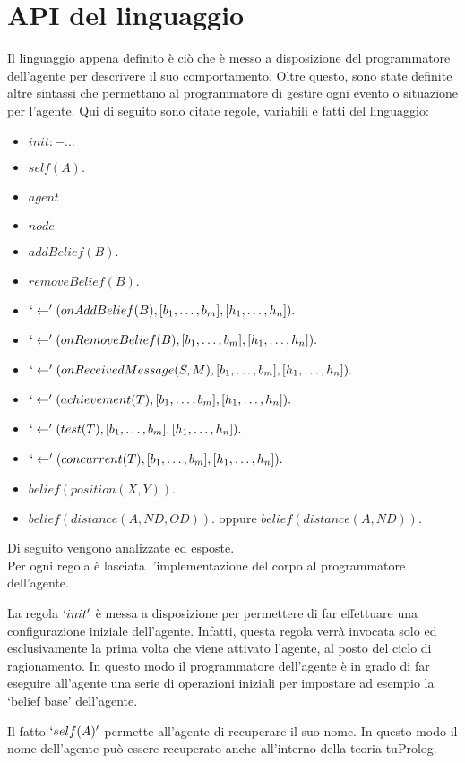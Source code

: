 \section{API del linguaggio}
Il linguaggio appena definito è ciò che è messo a disposizione del programmatore dell'agente per descrivere il suo comportamento. Oltre questo, sono state definite altre sintassi che permettano al programmatore di gestire ogni evento o situazione per l'agente.
Qui di seguito sono citate regole, variabili e fatti del linguaggio:
\begin{itemize}
\item $init :- \ldots$
\item $self(A).$
\item $agent$
\item $node$
\item $addBelief(B).$
\item $removeBelief(B).$
\item $`\leftarrow'(onAddBelief(B), [b_1, \ldots, b_m], [h_1, \ldots, h_n]).$
\item $`\leftarrow'(onRemoveBelief(B), [b_1, \ldots, b_m], [h_1, \ldots, h_n]).$
\item $`\leftarrow'(onReceivedMessage(S,M), [b_1, \ldots, b_m], [h_1, \ldots, h_n]).$
\item $`\leftarrow'(achievement(T), [b_1, \ldots, b_m], [h_1, \ldots, h_n]).$
\item $`\leftarrow'(test(T), [b_1, \ldots, b_m], [h_1, \ldots, h_n]).$
\item $`\leftarrow'(concurrent(T), [b_1, \ldots, b_m], [h_1, \ldots, h_n]).$
\item $belief(position(X,Y)).$
\item $belief(distance(A, ND, OD)).$ oppure $belief(distance(A, ND)).$
\end{itemize}

Di seguito vengono analizzate ed esposte.
\\
Per ogni regola è lasciata l'implementazione del corpo al programmatore dell'agente.

La regola $`init'$ è messa a disposizione per permettere di far effettuare una configurazione iniziale dell'agente. Infatti, questa regola verrà invocata solo ed esclusivamente la prima volta che viene attivato l'agente, al posto del ciclo di ragionamento. In questo modo il programmatore dell'agente è in grado di far eseguire all'agente una serie di operazioni iniziali per impostare ad esempio la `belief base' dell'agente.

\medskip
Il fatto $`self(A)'$ permette all'agente di recuperare il suo nome. In questo modo il nome dell'agente può essere recuperato anche all'interno della teoria tuProlog.

